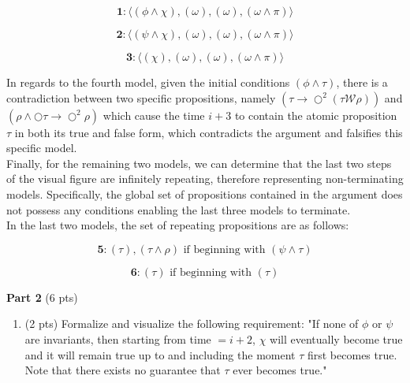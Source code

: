\documentclass[12pt]{article}
\begin{document}
\begin{spacing}{1.5}
\begin{enumerate}
		      $$\textbf{1}: \langle (\phi \land \chi), (\omega), (\omega), (\omega \land \pi) \rangle$$
		      		      		      		      		      		      
		      $$\textbf{2}: \langle (\psi \land \chi), (\omega),(\omega),(\omega \land \pi) \rangle$$
		      		      		      		      		      		      
		      $$\textbf{3}: \langle (\chi), (\omega),(\omega),(\omega \land \pi) \rangle $$
		      		      		      		      		      		      
		      In regards to the fourth model, given the initial conditions $(\phi \land \tau)$, there is a contradiction between two specific propositions, namely $(\tau \rightarrow \bigcirc^2(\tau \mathcal{W} \rho))$ and $(\rho \land \bigcirc \tau \rightarrow \bigcirc^2 \rho)$ which cause the time $i+3$ to contain the atomic proposition $\tau$ in both its true and false form, which contradicts the argument and falsifies this specific model.\\
		      		      		      		      		      		                      
		      Finally, for the remaining two models, we can determine that the last two steps of the visual figure are infinitely repeating, therefore representing non-terminating models. Specifically, the global set of propositions contained in the argument does not possess any conditions enabling the last three models to terminate.\\
		      		      		      		      		      		      
		      In the last two models, the set of repeating propositions are as follows:
		      		      		      		      		      		      
		      $$\textbf{5}: (\tau), (\tau \land \rho) \text{ if beginning with } (\psi \land \tau)$$
		      		      		      		      		      		      
		      $$\textbf{6}: (\tau) \text{ if beginning with } (\tau)$$
		      		      		      		      		      		      		              
	\end{enumerate}
						
	\textbf{Part 2} (6 pts)
						
	\begin{enumerate}
		\item (2 pts) Formalize and visualize the following requirement: "If none of $\phi$ or $\psi$ are invariants, then starting from time $=i+2$, $\chi$ will eventually become true and it will remain true up to and including the moment $\tau$ first becomes true. Note that there exists no guarantee that $\tau$ ever becomes true."\\
		      		      		      		      		      		      

\end{enumerate}
\end{spacing}
\end{document}
